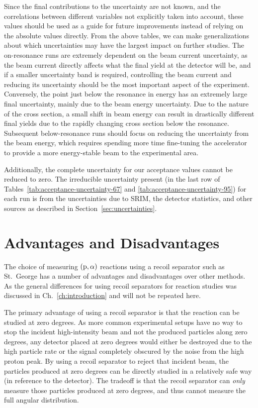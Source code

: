 Since the final contributions to the uncertainty are not known, and the
correlations between different variables not explicitly taken into
account, these values should be used as a guide for future improvements
instead of relying on the absolute values directly. From the above
tables, we can make generalizations about which uncertainties may have
the largest impact on further studies. The on-resonance runs are
extremely dependent on the beam current uncertainty, as the beam current
directly affects what the final yield at the detector will be, and if a
smaller uncertainty band is required, controlling the beam current and
reducing its uncertainty should be the most important aspect of the
experiment. Conversely, the point just below the resonance in energy has
an extremely large final uncertainty, mainly due to the beam energy
uncertainty. Due to the nature of the cross section, a small shift in
beam energy can result in drastically different final yields due to the
rapidly changing cross section below the resonance. Subsequent
below-resonance runs should focus on reducing the uncertainty from the
beam energy, which requires spending more time fine-tuning the
accelerator to provide a more energy-stable beam to the experimental
area.

Additionally, the complete uncertainty for our acceptance values cannot
be reduced to zero. The irreducible uncertainty present (in the last row
of Tables~\ref{tab:acceptance-uncertainty-67} and
\ref{tab:acceptance-uncertainty-95}) for each run is from the
uncertainties due to SRIM, the detector statistics, and other sources as
described in Section~\ref{sec:uncertainties}.


\section{Advantages and Disadvantages}

The choice of measuring $({\rm p},\alpha)$ reactions using a recoil
separator such as St.\ George has a number of advantages and
disadvantages over other methods. As the general differences for using
recoil separators for reaction studies was discussed in
Ch.~\ref{ch:introduction} and will not be repeated here.

The primary advantage of using a recoil separator is that the reaction
can be studied at zero degrees. As more common experimental setups have
no way to stop the incident high-intensity beam and not the produced
particles along zero degrees, any detector placed at zero degrees would
either be destroyed due to the high particle rate or the signal
completely obscured by the noise from the high proton peak. By using a
recoil separator to reject that incident beam, the particles produced at
zero degrees can be directly studied in a relatively safe way (in
reference to the detector). The tradeoff is that the recoil separator
can \textit{only} measure those particles produced at zero degrees, and
thus cannot measure the full angular distribution.

